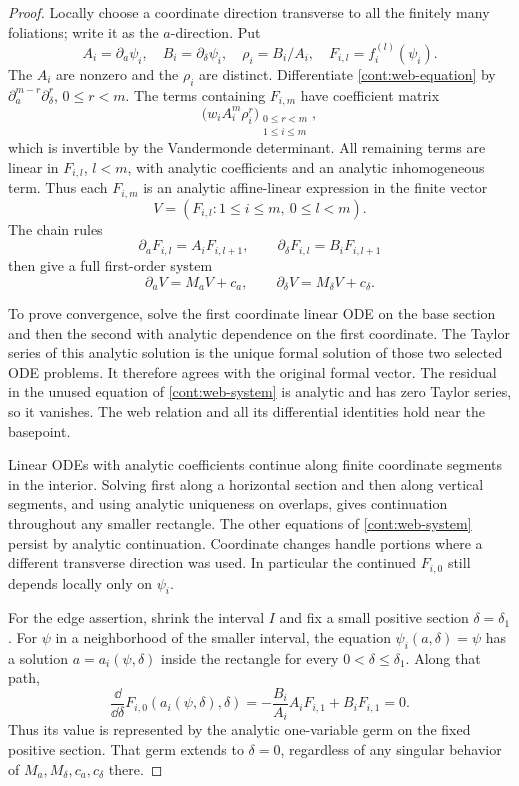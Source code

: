 \begin{proof}
Locally choose a coordinate direction transverse to all the
finitely many foliations; write it as the \(a\)-direction.
Put
\[
 A_i=\partial_a\psi_i,\quad B_i=\partial_\delta\psi_i,
 \quad \rho_i=B_i/A_i,\quad
 F_{i,l}=f_i^{(l)}(\psi_i).
 \]
The \(A_i\) are nonzero and the \(\rho_i\) are distinct.
Differentiate \eqref{cont:web-equation} by
\(\partial_a^{m-r}\partial_\delta^r\), \(0\le r<m\).
The terms containing \(F_{i,m}\) have coefficient matrix
\[
 \big(w_i A_i^m\rho_i^r\big)_{\substack{0\le r<m\\1\le i\le m}},
 \]
which is invertible by the Vandermonde determinant.
All remaining terms are linear in \(F_{i,l}\), \(l<m\),
with analytic coefficients and an analytic inhomogeneous
term.  Thus each \(F_{i,m}\) is an analytic affine-linear
expression in the finite vector
\[
 V=(F_{i,l}:1\le i\le m,\ 0\le l<m).
 \]
The chain rules
\[
 \partial_a F_{i,l}=A_iF_{i,l+1},\qquad
 \partial_\delta F_{i,l}=B_iF_{i,l+1}
 \]
then give a full first-order system
\begin{equation}
 \partial_aV=M_aV+c_a,\qquad
 \partial_\delta V=M_\delta V+c_\delta.
 \label{cont:web-system}
\end{equation}

To prove convergence, solve the first coordinate linear ODE on
the base section and then the second with analytic dependence
on the first coordinate.  The Taylor series of this analytic
solution is the unique formal solution of those two selected
ODE problems.  It therefore agrees with the original formal
vector.  The residual in the unused equation of
\eqref{cont:web-system} is analytic and has zero Taylor
series, so it vanishes.  The web relation and all its
differential identities hold near the basepoint.

Linear ODEs with analytic coefficients continue along finite
coordinate segments in the interior.  Solving first along a
horizontal section and then along vertical segments, and
using analytic uniqueness on overlaps, gives continuation
throughout any smaller rectangle.  The other equations of
\eqref{cont:web-system} persist by analytic continuation.
Coordinate changes handle portions where a different
transverse direction was used.  In particular the continued
\(F_{i,0}\) still depends locally only on \(\psi_i\).

For the edge assertion, shrink the interval \(I\) and fix a
small positive section \(\delta=\delta_1\).  For \(\psi\) in
a neighborhood of the smaller interval, the equation
\(\psi_i(a,\delta)=\psi\) has a solution \(a=a_i(\psi,\delta)\)
inside the rectangle for every \(0<\delta\le\delta_1\).
Along that path,
\[
 \frac{\dd}{\dd\delta}F_{i,0}(a_i(\psi,\delta),\delta)
 =
 -\frac{B_i}{A_i}A_iF_{i,1}+B_iF_{i,1}=0.
 \]
Thus its value is represented by the analytic one-variable
germ on the fixed positive section.  That germ extends to
\(\delta=0\), regardless of any singular behavior of
\(M_a,M_\delta,c_a,c_\delta\) there.
\end{proof}

